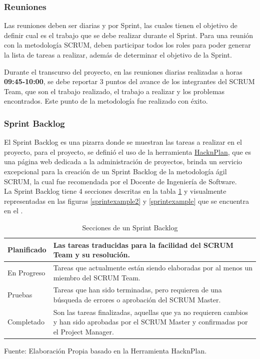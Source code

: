 \subsubsection{Reuniones}

Las reuniones deben ser diarias y por Sprint, las cuales tienen el objetivo de definir cual es el trabajo que se debe realizar durante el Sprint. Para una reunión con la metodología SCRUM, deben participar todos los roles para poder generar la lista de tareas a realizar, además de determinar el objetivo de la Sprint.

Durante el transcurso del proyecto, en las reuniones diarias realizadas a horas \textbf{09:45-10:00}, se debe reportar 3 puntos del avance de los integrantes del SCRUM Team, que son el trabajo realizado, el trabajo a realizar y los problemas encontrados. Este punto de la metodología fue realizado con éxito.

\subsubsection{Sprint Backlog}

El Sprint Backlog es una pizarra donde se muestran las tareas a realizar en el proyecto, para el proyecto, se definió el uso de la herramienta \href{https://hacknplan.com/}{HacknPlan}, que es una página web dedicada a la administración de proyectos, brinda un servicio excepcional para la creación de un Sprint Backlog de la metodología ágil SCRUM, la cual fue recomendada por el Docente de Ingeniería de Software.
\\
La Sprint Backlog tiene 4 secciones descritas en la tabla \ref{sprintbacklog} y visualmente representadas en las figuras \ref{sprintexample2} y \ref{sprintexample} que se encuentra en el .


\begin{table}[t!]
	\begin{center}
		\begin{tabular}{| m{3cm} | m{11cm} |  }
			\hline Planificado & Las tareas traducidas para la facilidad del SCRUM Team y su resolución. \\ \hline
			En Progreso & Tareas que actualmente están siendo elaboradas por al menos un miembro del SCRUM Team. \\ \hline
			Pruebas & Tareas que han sido terminadas, pero requieren de una búsqueda de errores o aprobación del SCRUM Master. \\ \hline
			Completado & Son las tareas finalizadas, aquellas que ya no requieren cambios y han sido aprobadas por el SCRUM Master y confirmadas por el Project Manager.  \\ \hline
		\end{tabular}
		\caption{Secciones de un Sprint Backlog}
		\label{sprintbacklog}
		\footnotesize Fuente: Elaboración Propia basado en la Herramienta HacknPlan.
	\end{center}
\end{table}

